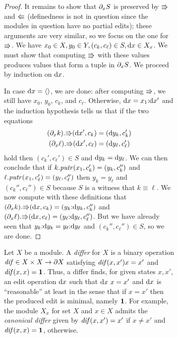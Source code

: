 \begin{figure}
\begin{figure}
\begin{proof}
It remains to show that $\partial_xS$ is preserved by $\mathord{\Rrightarrow}$ and
$\mathord{\Lleftarrow}$ (definedness is not in question since the modules in question have
no partial edits); these arguments are very similar, so we focus on the one for
$\mathord{\Rrightarrow}$. We have $x_0 \in X,y_0 \in Y,(c_k,c_\ell) \in S,\textrm{d} x \in X_x$. We
must show that computing $\mathord{\Rrightarrow}$ with these values produces values that
form a tuple in $\partial_xS$. We proceed by induction on $\textrm{d} x$.

In case $\textrm{d} x=\left<\right>$, we are done: after computing $\mathord{\Rrightarrow}$, we still
have $x_0$, $y_0$, $c_k$, and $c_\ell$. Otherwise, $\textrm{d} x = x_1\mathord{:}\textrm{d} x'$ and
the induction hypothesis tells us that if the two equations
\begin{align*}
(\partial_xk).\mathord{\Rrightarrow}(\textrm{d} x',c_k)&=(\textrm{d} y_k,c_k')\\
(\partial_x\ell).\mathord{\Rrightarrow}(\textrm{d} x',c_\ell)&=(\textrm{d} y_\ell,c_\ell')
\end{align*}
hold then $(c_k',c_\ell') \in S$ and $\textrm{d} y_k=\textrm{d} y_\ell$. We can then conclude
that if $k.\mathit{putr}(x_1,c_k')=(y_k,c_k'')$ and
$\ell.\mathit{putr}(x_1,c_\ell')=(y_\ell,c_\ell'')$ then $y_k=y_\ell$ and
$(c_k'',c_\ell'') \in S$ because $S$ is a witness that $k \equiv \ell$.
We now compute with these definitions that
$(\partial_xk).\mathord{\Rrightarrow}(\textrm{d} x,c_k)=(y_k\mathord{:}\textrm{d} y_k,c_k'')$ and
$(\partial_x\ell).\mathord{\Rrightarrow}(\textrm{d} x,c_\ell)=(y_\ell\mathord{:}\textrm{d} y_\ell,c_\ell'')$. But we
have already seen that $y_k\mathord{:}\textrm{d} y_k=y_\ell\mathord{:}\textrm{d} y_\ell$ and $(c_k'',c_\ell'') \in
S$, so we are done.
\end{proof}
\fi

Let $X$ be a module. A \emph{differ} for $X$ is a binary operation
$\mathit{dif} \in X\times X \rightarrow \partial X$ satisfying
$\mathit{dif}(x,x')x=x'$ and $\mathit{dif}(x,x)=\mbox{\bf{1}}$.
%
Thus, a differ finds, for given states $x,x'$, an edit operation $\textrm{d} x$
such that $\textrm{d} x\ x=x'$ and $\textrm{d} x$ is ``reasonable'' at least in the sense that
if $x=x'$ then the produced edit is minimal, namely $\mbox{\bf{1}}$.  For example,
the module $X_x$ for set $X$ and $x\in X$ admits the \emph{canonical
  differ} given by $\mathit{dif}(x,x')=x'$ if $x\neq x'$ and
$\mathit{dif}(x,x)=\mbox{\bf{1}}$, otherwise.


\end{figure}
\end{figure}

